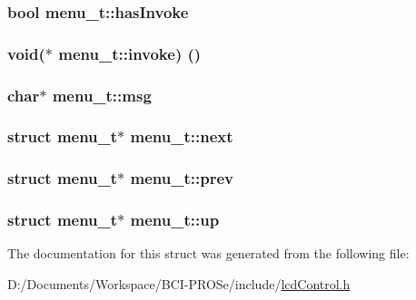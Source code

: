 \subsubsection[{\texorpdfstring{has\+Invoke}{hasInvoke}}]{\setlength{\rightskip}{0pt plus 5cm}bool menu\+\_\+t\+::has\+Invoke}\hypertarget{structmenu__t_a601f4454d1228e609ec0a1dfa89b116e}{}\label{structmenu__t_a601f4454d1228e609ec0a1dfa89b116e}
\subsubsection[{\texorpdfstring{invoke}{invoke}}]{\setlength{\rightskip}{0pt plus 5cm}void($\ast$ menu\+\_\+t\+::invoke) ()}\hypertarget{structmenu__t_a6ab085cf818612e72384c072ea04154f}{}\label{structmenu__t_a6ab085cf818612e72384c072ea04154f}
\subsubsection[{\texorpdfstring{msg}{msg}}]{\setlength{\rightskip}{0pt plus 5cm}char$\ast$ menu\+\_\+t\+::msg}\hypertarget{structmenu__t_a41c914d5cf48adc4c811828b4543a3da}{}\label{structmenu__t_a41c914d5cf48adc4c811828b4543a3da}
\subsubsection[{\texorpdfstring{next}{next}}]{\setlength{\rightskip}{0pt plus 5cm}struct {\bf menu\+\_\+t}$\ast$ menu\+\_\+t\+::next}\hypertarget{structmenu__t_ac8c3484250d79851fc4a1d78e6bfe35e}{}\label{structmenu__t_ac8c3484250d79851fc4a1d78e6bfe35e}
\subsubsection[{\texorpdfstring{prev}{prev}}]{\setlength{\rightskip}{0pt plus 5cm}struct {\bf menu\+\_\+t}$\ast$ menu\+\_\+t\+::prev}\hypertarget{structmenu__t_aa735a064d85ddc4550472eda861d3647}{}\label{structmenu__t_aa735a064d85ddc4550472eda861d3647}
\subsubsection[{\texorpdfstring{up}{up}}]{\setlength{\rightskip}{0pt plus 5cm}struct {\bf menu\+\_\+t}$\ast$ menu\+\_\+t\+::up}\hypertarget{structmenu__t_a607f9b5438465de6a26e0b480e892cc9}{}\label{structmenu__t_a607f9b5438465de6a26e0b480e892cc9}


The documentation for this struct was generated from the following file\+:\begin{DoxyCompactItemize}
\item 
D\+:/\+Documents/\+Workspace/\+B\+C\+I-\/\+P\+R\+O\+Se/include/\hyperlink{lcd_control_8h}{lcd\+Control.\+h}\end{DoxyCompactItemize}
